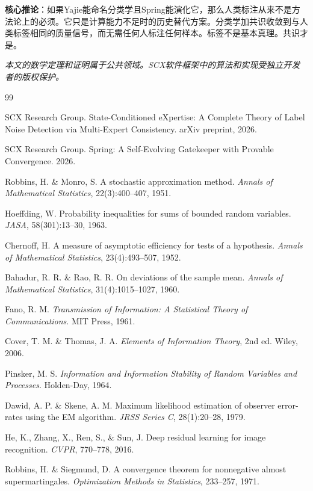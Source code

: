 \documentclass[12pt,a4paper]{ctexart}
\theoremstyle{definition}
\theoremstyle{remark}
\begin{document}
\textbf{核心推论}：如果Yajie能命名分类学且Spring能演化它，那么人类标注从来不是方法论上的必须。它只是计算能力不足时的历史替代方案。分类学加共识收敛到与人类标签相同的质量信号，而无需任何人标注任何样本。标签不是基本真理。共识才是。

\bigskip
\noindent\textit{本文的数学定理和证明属于公共领域。SCX软件框架中的算法和实现受独立开发者的版权保护。}

\begin{thebibliography}{99}

 SCX Research Group. State-Conditioned eXpertise: A Complete Theory of Label Noise Detection via Multi-Expert Consistency. arXiv preprint, 2026.

 SCX Research Group. Spring: A Self-Evolving Gatekeeper with Provable Convergence. 2026.

 Robbins, H. \& Monro, S. A stochastic approximation method. \textit{Annals of Mathematical Statistics}, 22(3):400–407, 1951.

 Hoeffding, W. Probability inequalities for sums of bounded random variables. \textit{JASA}, 58(301):13–30, 1963.

 Chernoff, H. A measure of asymptotic efficiency for tests of a hypothesis. \textit{Annals of Mathematical Statistics}, 23(4):493–507, 1952.

 Bahadur, R. R. \& Rao, R. R. On deviations of the sample mean. \textit{Annals of Mathematical Statistics}, 31(4):1015–1027, 1960.

 Fano, R. M. \textit{Transmission of Information: A Statistical Theory of Communications}. MIT Press, 1961.

 Cover, T. M. \& Thomas, J. A. \textit{Elements of Information Theory}, 2nd ed. Wiley, 2006.

 Pinsker, M. S. \textit{Information and Information Stability of Random Variables and Processes}. Holden-Day, 1964.

 Dawid, A. P. \& Skene, A. M. Maximum likelihood estimation of observer error-rates using the EM algorithm. \textit{JRSS Series C}, 28(1):20–28, 1979.

 He, K., Zhang, X., Ren, S., \& Sun, J. Deep residual learning for image recognition. \textit{CVPR}, 770–778, 2016.

 Robbins, H. \& Siegmund, D. A convergence theorem for nonnegative almost supermartingales. \textit{Optimization Methods in Statistics}, 233–257, 1971.


\end{thebibliography}
\end{document}
